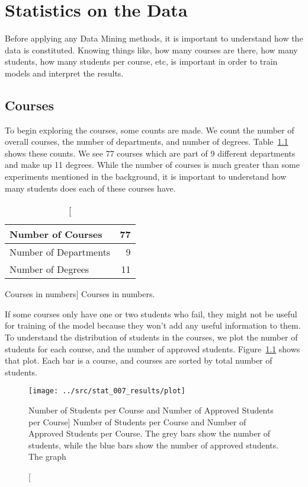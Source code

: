 \chapter{Statistics on the Data}
\label{sec:stats}

Before applying any Data Mining methods, it is important to understand how the
data is constituted. Knowing things like, how many courses are there, how many
students, how many students per course, etc, is important in order to train
models and interpret the results.

\section{Courses}

To begin exploring the courses, some counts are made. We count the number of
overall courses, the number of departments, and number of degrees.
Table~\ref{tab:courses_stats} shows these counts. We see 77 courses which are
part of 9 different departments and make up 11 degrees. While the number of
courses is much greater than some experiments mentioned in the background, it
is important to understand how many students does each of these courses have.

\begin{table}[h!]
    \centering

    \begin{tabular}{| l | r |}
        \hline
        Number of Courses     & 77 \\ \hline
        Number of Departments & 9  \\ \hline
        Number of Degrees     & 11 \\ \hline
    \end{tabular}

    \caption
        [Courses in numbers]
        {Courses in numbers.}

    \label{tab:courses_stats}
\end{table}

If some courses only have one or two students who fail, they might not be
useful for training of the model because they won't add any useful information
to them. To understand the distribution of students in the courses, we plot the
number of students for each course, and the number of approved students.
Figure~\ref{fig:stat_007} shows that plot. Each bar is a course, and courses
are sorted by total number of students.

\begin{figure}[h!]
    \centering

    \texttt{[image: ../src/stat\_007\_results/plot]}

    \caption
        [Number of Students per Course and Number of Approved Students per
        Course]
        {Number of Students per Course and Number of Approved Students per
        Course. The grey bars show the number of students, while the blue bars
        show the number of approved students. The graph}

    \label{fig:stat_007}
\end{figure}

